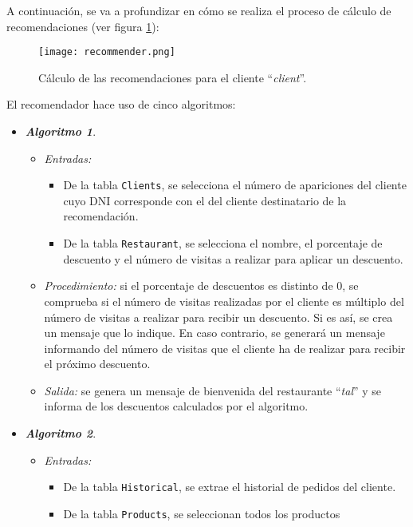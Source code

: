 A continuación, se va a profundizar en cómo se realiza el proceso de cálculo
de recomendaciones (ver figura \ref{fig:recommender}):

  \begin{figure}[H]
    \begin{center}
      \texttt{[image: recommender.png]}
      \caption{Cálculo de las recomendaciones para el cliente
      ``\emph{client}''.}
      \label{fig:recommender}
    \end{center}
  \end{figure}

El recomendador hace uso de cinco algoritmos:
\begin{itemize}
\item \textbf{\emph{Algoritmo 1}}.
  \begin{itemize}
  \item \emph{Entradas:}
    \begin{itemize}
    \item De la tabla \texttt{Clients}, se selecciona el número de apariciones 
    del cliente cuyo DNI corresponde con el del cliente destinatario de la
    recomendación.
    \item De la tabla \texttt{Restaurant}, se selecciona el nombre, el
    porcentaje de descuento y el número de visitas a realizar para aplicar un
    descuento.
    \end{itemize}
  \item \emph{Procedimiento:} si el porcentaje de descuentos es distinto de 0,
  se comprueba si el número de visitas realizadas por el cliente es múltiplo 
  del número de visitas a realizar para recibir un descuento. Si es así,
  se crea un mensaje que lo indique. En caso contrario, se generará un
  mensaje informando del número de visitas que el cliente ha de realizar para 
  recibir el próximo descuento.
  \item \emph{Salida:} se genera un mensaje de bienvenida del restaurante
  ``\emph{tal}'' y se informa de los descuentos calculados por el algoritmo.
  \end{itemize}
\item \textbf{\emph{Algoritmo 2}}.
  \begin{itemize}
  \item \emph{Entradas:}
    \begin{itemize}
    \item De la tabla \texttt{Historical}, se extrae el historial de pedidos
    del cliente.
    \item De la tabla \texttt{Products}, se seleccionan todos los productos

\end{itemize}
\end{itemize}
\end{itemize}
